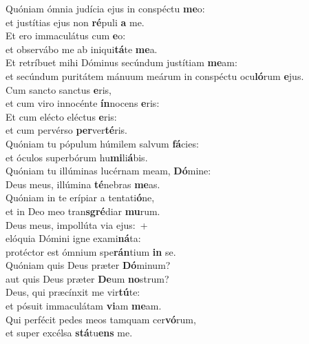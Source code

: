 \oddverse Quóniam ómnia judícia ejus in conspéctu \textbf{me}o:~\*\\
\oddverse et justítias ejus non \textbf{ré}puli \textbf{a} me.\\
\evenverse Et ero immaculátus cum \textbf{e}o:~\*\\
\evenverse et observábo me ab iniqui\textbf{tá}te \textbf{me}a.\\
\oddverse Et retríbuet mihi Dóminus secúndum justítiam \textbf{me}am:~\*\\
\oddverse et secúndum puritátem mánuum meárum in conspéctu ocu\textbf{ló}rum \textbf{e}jus.\\
\evenverse Cum sancto sanctus \textbf{e}ris,~\*\\
\evenverse et cum viro innocénte \textbf{ín}nocens \textbf{e}ris:\\
\oddverse Et cum elécto eléctus \textbf{e}ris:~\*\\
\oddverse et cum pervérso \textbf{per}ver\textbf{té}ris.\\
\evenverse Quóniam tu pópulum húmilem salvum \textbf{fá}cies:~\*\\
\evenverse et óculos superbórum hu\textbf{mi}li\textbf{á}bis.\\
\oddverse Quóniam tu illúminas lucérnam meam, \textbf{Dó}mine:~\*\\
\oddverse Deus meus, illúmina \textbf{té}nebras \textbf{me}as.\\
\evenverse Quóniam in te erípiar a tentati\textbf{ó}ne,~\*\\
\evenverse et in Deo meo tran\textbf{sgré}diar \textbf{mu}rum.\\
\oddverse Deus meus, impollúta via ejus:~+\\
\oddverse  elóquia Dómini igne exami\textbf{ná}ta:~\*\\
\oddverse protéctor est ómnium spe\textbf{rán}tium \textbf{in} se.\\
\evenverse Quóniam quis Deus præter \textbf{Dó}minum?~\*\\
\evenverse aut quis Deus præter \textbf{De}um \textbf{no}strum?\\
\oddverse Deus, qui præcínxit me vir\textbf{tú}te:~\*\\
\oddverse et pósuit immaculátam \textbf{vi}am \textbf{me}am.\\
\evenverse Qui perfécit pedes meos tamquam cer\textbf{vó}rum,~\*\\
\evenverse et super excélsa \textbf{stá}tu\textbf{ens} me.\\
